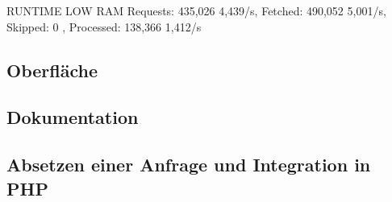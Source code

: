 RUNTIME LOW RAM
Requests: 435,026 4,439/s, Fetched: 490,052 5,001/s, Skipped: 0 , Processed: 138,366 1,412/s


\subsection{Oberfläche}

\subsection{Dokumentation}

\subsection{Absetzen einer Anfrage und Integration in PHP}